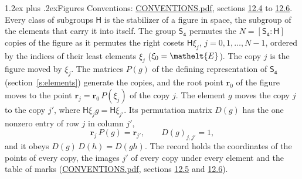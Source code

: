 \documentclass[10pt,a4paper]{article}
\makeatletter
\renewcommand\section{\@startsection{section}{1}{\z@}{-3ex plus -1ex minus -.2ex}%
  {1.2ex plus .2ex}{\normalfont\large\sffamily\bfseries\color{parttitle}}}
\numberwithin{equation}{section}
\newcommand{\eltfont}[1]{{\let\sigma\eltsigma\mathelt{#1}}}
\newcommand{\grp}[1]{\mathsf{#1}}
\newcommand{\cls}[1]{\eltfont{#1}}
\newcommand{\pointr}{\mathbf{r}}
\makeatother
\begin{document}
\section{Figures}\label{s:permutation}
Conventions: \href{../../CONVENTIONS.pdf}{CONVENTIONS.pdf}, sections \href{../../CONVENTIONS.pdf\#conv.12.4}{12.4} to \href{../../CONVENTIONS.pdf\#conv.12.6}{12.6}.
Every class of subgroups $\grp{H}$ is the stabilizer of a figure in space, the subgroup of the elements that carry it into itself. \label{n:local.orbit.size}\label{n:element.coset.least}\label{n:index.coset}The group $\grp{S_{4}}$ permutes the $N = [\grp{S_{4}} : \grp{H}]$ copies of the figure as it permutes the right cosets $\grp{H}\xi_j$, $j = 0, 1, \dots, N - 1$, ordered by the indices of their least elements $\xi_j$ ($\xi_0 = \cls{E}$). The copy $j$ is the figure moved by $\xi_j$. The matrices $P(g)$ of the defining representation of $\grp{S_{4}}$ (section~\ref{s:elements}) generate the copies, and the root point $\pointr_0$ of the figure moves to the point $\pointr_j = \pointr_0\, P(\xi_j)$ of the copy $j$. \label{n:local.coset.image}The element $g$ moves the copy $j$ to the copy $j'$, where $\grp{H}\xi_j g = \grp{H}\xi_{j'}$. \label{n:local.matrix.permutation}Its permutation matrix $D(g)$ has the one nonzero entry of row $j$ in column $j'$,
\begin{equation}\label{e:perm.matrix}\pointr_j\, P(g) = \pointr_{j'}, \qquad D(g)_{j,j'} = 1,\end{equation}
and it obeys $D(g)\, D(h) = D(gh)$. The record holds the coordinates of the points of every copy, the images $j'$ of every copy under every element and the table of marks (\href{../../CONVENTIONS.pdf}{CONVENTIONS.pdf}, sections \href{../../CONVENTIONS.pdf\#conv.12.5}{12.5} and \href{../../CONVENTIONS.pdf\#conv.12.6}{12.6}).
\end{document}
